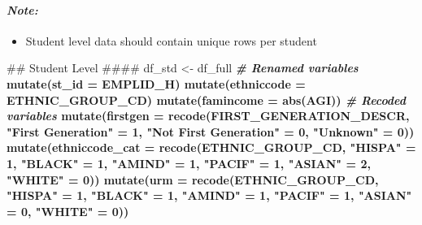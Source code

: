 \documentclass[]{article}
\newenvironment{Shaded}{\begin{snugshade}}{\end{snugshade}}
\newcommand{\KeywordTok}[1]{\textcolor[rgb]{0.13,0.29,0.53}{\textbf{#1}}}
\newcommand{\DataTypeTok}[1]{\textcolor[rgb]{0.13,0.29,0.53}{#1}}
\newcommand{\DecValTok}[1]{\textcolor[rgb]{0.00,0.00,0.81}{#1}}
\newcommand{\StringTok}[1]{\textcolor[rgb]{0.31,0.60,0.02}{#1}}
\newcommand{\CommentTok}[1]{\textcolor[rgb]{0.56,0.35,0.01}{\textit{#1}}}
\newcommand{\OperatorTok}[1]{\textcolor[rgb]{0.81,0.36,0.00}{\textbf{#1}}}
\newcommand{\NormalTok}[1]{#1}
\providecommand{\tightlist}{%
  \setlength{\itemsep}{0pt}\setlength{\parskip}{0pt}}
\let\oldparagraph\paragraph
\renewcommand{\paragraph}[1]{\oldparagraph{#1}\mbox{}}
\begin{document}
\paragraph{\texorpdfstring{\emph{Note:}}{Note:}}\label{note-1}

\begin{itemize}
\tightlist
\item
  Student level data should contain unique rows per student
\end{itemize}

\begin{Shaded}
\begin{Highlighting}[]
\NormalTok{## Student Level ####}
\NormalTok{df_std <-}\StringTok{ }\NormalTok{df_full }\OperatorTok{%>%}
\StringTok{  }\CommentTok{# Renamed variables}
\StringTok{  }\KeywordTok{mutate}\NormalTok{(}\DataTypeTok{st_id =}\NormalTok{ EMPLID_H) }\OperatorTok{%>%}
\StringTok{  }\KeywordTok{mutate}\NormalTok{(}\DataTypeTok{ethniccode =}\NormalTok{ ETHNIC_GROUP_CD) }\OperatorTok{%>%}
\StringTok{  }\KeywordTok{mutate}\NormalTok{(}\DataTypeTok{famincome =} \KeywordTok{abs}\NormalTok{(AGI)) }\OperatorTok{%>%}
\StringTok{  }\CommentTok{# Recoded variables}
\StringTok{  }\KeywordTok{mutate}\NormalTok{(}\DataTypeTok{firstgen =} \KeywordTok{recode}\NormalTok{(FIRST_GENERATION_DESCR, }\StringTok{"First Generation"}\NormalTok{ =}\StringTok{ }\DecValTok{1}\NormalTok{, }\StringTok{"Not First Generation"}\NormalTok{ =}\StringTok{ }\DecValTok{0}\NormalTok{, }\StringTok{"Unknown"}\NormalTok{ =}\StringTok{ }\DecValTok{0}\NormalTok{)) }\OperatorTok{%>%}
\StringTok{  }\KeywordTok{mutate}\NormalTok{(}\DataTypeTok{ethniccode_cat =} \KeywordTok{recode}\NormalTok{(ETHNIC_GROUP_CD, }\StringTok{"HISPA"}\NormalTok{ =}\StringTok{ }\DecValTok{1}\NormalTok{, }\StringTok{"BLACK"}\NormalTok{ =}\StringTok{ }\DecValTok{1}\NormalTok{, }\StringTok{"AMIND"}\NormalTok{ =}\StringTok{ }\DecValTok{1}\NormalTok{, }\StringTok{"PACIF"}\NormalTok{ =}\StringTok{ }\DecValTok{1}\NormalTok{, }\StringTok{"ASIAN"}\NormalTok{ =}\StringTok{ }\DecValTok{2}\NormalTok{, }\StringTok{"WHITE"}\NormalTok{ =}\StringTok{ }\DecValTok{0}\NormalTok{)) }\OperatorTok{%>%}
\StringTok{  }\KeywordTok{mutate}\NormalTok{(}\DataTypeTok{urm =} \KeywordTok{recode}\NormalTok{(ETHNIC_GROUP_CD, }\StringTok{"HISPA"}\NormalTok{ =}\StringTok{ }\DecValTok{1}\NormalTok{, }\StringTok{"BLACK"}\NormalTok{ =}\StringTok{ }\DecValTok{1}\NormalTok{, }\StringTok{"AMIND"}\NormalTok{ =}\StringTok{ }\DecValTok{1}\NormalTok{, }\StringTok{"PACIF"}\NormalTok{ =}\StringTok{ }\DecValTok{1}\NormalTok{, }\StringTok{"ASIAN"}\NormalTok{ =}\StringTok{ }\DecValTok{0}\NormalTok{, }\StringTok{"WHITE"}\NormalTok{ =}\StringTok{ }\DecValTok{0}\NormalTok{)) }\OperatorTok{%>%}
}}}}}}}
\end{Highlighting}
\end{Shaded}
\end{document}
